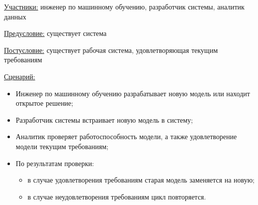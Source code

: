\underline{Участники:} инженер по машинному обучению, разработчик системы, аналитик данных

\underline{Предусловие:} существует система

\underline{Постусловие:} существует рабочая система, удовлетворяющая текущим требованиям

\underline{Сценарий:}

\begin{itemize}
    \item Инженер по машинному обучению разрабатывает новую модель или находит открытое решение;
    \item Разработчик системы встраивает новую модель в систему;
    \item Аналитик проверяет работоспособность модели, а также удовлетворение модели текущим требованиям;
    \item По результатам проверки:
        \begin{itemize}
            \item в случае удовлетворения требованиям старая модель заменяется на новую;
            \item в случае неудовлетворения требованиям цикл повторяется.
        \end{itemize}
\end{itemize}